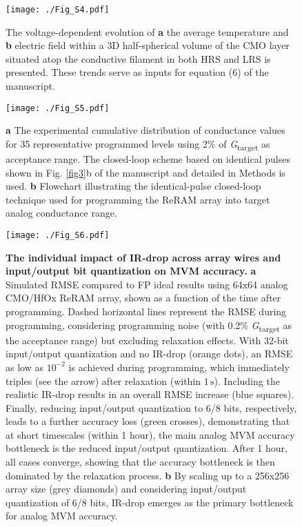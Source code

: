 \begin{figure}[H]
\centering
\texttt{[image: ./Fig\_S4.pdf]}
\caption{
The voltage-dependent evolution of \textbf{a} the average temperature and \textbf{b} electric field within a 3D half-spherical volume of the CMO layer situated atop the conductive filament in both HRS and LRS is presented. These trends serve as inputs for equation (6) of the manuscript.}
\label{figS4}
\end{figure}

\begin{figure}[H]
\centering
\texttt{[image: ./Fig\_S5.pdf]}
\caption{\textbf{a} The experimental cumulative distribution of conductance values for 35 representative programmed levels using 2\% of \textit{G}\textsubscript{\textnormal{target}} as acceptance range. The closed-loop scheme based on identical pulses shown in Fig. \ref{fig3}b of the manuscript and detailed in Methods is used. \textbf{b} Flowchart illustrating the identical-pulse closed-loop technique used for programming the ReRAM array into target analog conductance range.}
\label{figS5}
\end{figure}

\begin{figure}[H]
\centering
\texttt{[image: ./Fig\_S6.pdf]}
\caption{ \textbf{The individual impact of IR-drop across array wires and input/output bit quantization on MVM accuracy.} \textbf{a} Simulated RMSE compared to FP ideal results using 64x64 analog CMO/HfOx ReRAM array, shown as a function of the time after programming. Dashed horizontal lines represent the RMSE during programming, considering programming noise (with 0.2\% \textit{G}\textsubscript{\textnormal{target}} as the acceptance range) but excluding relaxation effects. With 32-bit input/output quantization and no IR-drop (orange dots), an RMSE as low as $10^{-2}$ is achieved during programming, which immediately triples (see the arrow) after relaxation (within \(\mathrm{1 \, s}\)). Including the realistic IR-drop results in an overall RMSE increase (blue squares). Finally, reducing input/output quantization to 6/8 bits, respectively, leads to a further accuracy loss (green crosses), demonstrating that at short timescales (within 1 hour), the main analog MVM accuracy bottleneck is the reduced input/output quantization. After 1 hour, all cases converge, showing that the accuracy bottleneck is then dominated by the relaxation process. \textbf{b} By scaling up to a 256x256 array size (grey diamonds) and considering input/output quantization of 6/8 bits, IR-drop emerges as the primary bottleneck for analog MVM accuracy.}
\label{figS6}
\end{figure}

